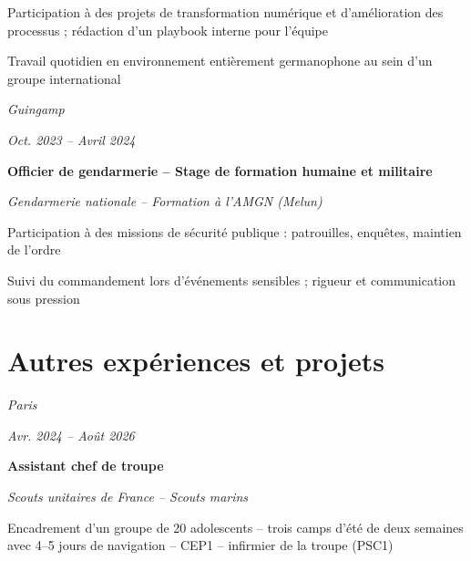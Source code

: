 \documentclass[10pt]{article}
\begin{document}
    \bulletsep
    \begin{onecolentry}
        \begin{highlights}
            \item Participation à des projets de transformation numérique et d'amélioration des processus ; rédaction d'un playbook interne pour l'équipe
            \item Travail quotidien en environnement entièrement germanophone au sein d'un groupe international
        \end{highlights}
    \end{onecolentry}

    \entrysep

    \begin{twocolentry}{
    \textit{Guingamp}

    \textit{Oct. 2023 – Avril 2024}}
        \textbf{Officier de gendarmerie -- Stage de formation humaine et militaire}

        \textit{Gendarmerie nationale -- Formation à l'AMGN (Melun)}
    \end{twocolentry}

    \bulletsep
    \begin{onecolentry}
        \begin{highlights}
            \item Participation à des missions de sécurité publique : patrouilles, enquêtes, maintien de l'ordre
            \item Suivi du commandement lors d'événements sensibles ; rigueur et communication sous pression
        \end{highlights}
    \end{onecolentry}


\section{Autres expériences et projets}

    \begin{twocolentry}{
    \textit{Paris}

    \textit{Avr. 2024 – Août 2026}}
        \textbf{Assistant chef de troupe}

        \textit{Scouts unitaires de France -- Scouts marins}
    \end{twocolentry}

    \bulletsep
    \begin{onecolentry}
        \begin{highlights}
            \item Encadrement d'un groupe de 20 adolescents -- trois camps d'été de deux semaines avec 4--5 jours de navigation -- CEP1 -- infirmier de la troupe (PSC1)
        \end{highlights}
    \end{onecolentry}
\end{document}
